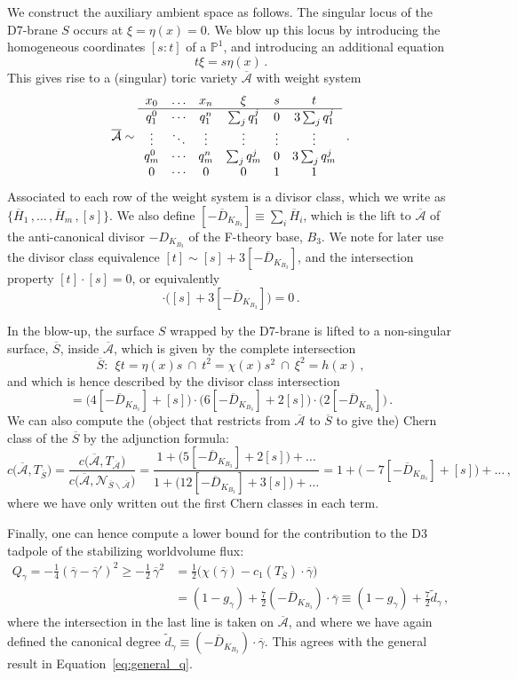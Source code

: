 \documentclass[a4paper,12pt]{article}
\numberwithin{equation}{section}
\newcommand{\mc}{\mathcal}
\newcommand{\mbb}{\mathbb}
\newcommand{\be}{\begin{equation}}
\newcommand{\ee}{\end{equation}}
\newcommand{\fthb}{B_3}				%
\newcommand{\cand}[1]{D_{K_{#1}}}		%
\newcommand{\candl}{\overline{D}_{K_{B_3}}}	%
\newcommand{\asl}{\overline{\mc{A}}}	%
\newcommand{\db}{S}					%
\newcommand{\dbl}{\overline{S}}		%
\newcommand{\crv}{\gamma}			%
\newcommand{\crvl}{\overline{\gamma}}	%
\newcommand{\degr}[1]{\tilde{d}_{#1}}			%
\newcommand{\tanb}[1]{T_{#1}}			%
\newcommand{\nrmb}[2]{\mc{N}_{{#1}\backslash{#2}}}%
\begin{document}
We construct the auxiliary ambient space as follows. The singular locus of the D7-brane $\db$ occurs at $\xi=\eta(x)=0$. We blow up this locus by introducing the homogeneous coordinates $[s:t]$ of a $\mbb{P}^1$, and introducing an additional equation
\be
t \xi = s \eta(x) \,.
\ee
This gives rise to a (singular) toric variety $\asl$ with weight system
\be
\asl \sim
\begin{array}{c c c c c c}
x_0 & \ldots & x_n & \xi & s & t \\
\hline
q_1^0 & \cdots & q_1^n & \sum_j q_1^j & 0 & 3\sum_j q_1^j \\
\vdots & \ddots & \vdots & \vdots & \vdots & \vdots  \\
q_m^0 & \cdots & q_m^n & \sum_j q_m^j & 0 & 3\sum_j q_m^j  \\
0 & \cdots & 0 & 0 & 1 & 1 
\end{array} ~.
\ee
Associated to each row of the weight system is a divisor class, which we write as $\{\overline{H}_1 \,, \ldots \,, \overline{H}_m \,, [s]\}$. We also define $[-\candl] \equiv \sum_i \overline{H}_i$, which is the lift to $\asl$ of the anti-canonical divisor $-\cand{\fthb}$ of the F-theory base, $\fthb$. We note for later use the divisor class equivalence $[t] \sim [s]+3[-\candl]$, and the intersection property $[t] \cdot [s] = 0$, or equivalently
\be
[s] \cdot \big([s] + 3[-\candl]\big) = 0 \,.
\ee

In the blow-up, the surface $\db$ wrapped by the D7-brane is lifted to a non-singular surface, $\dbl$, inside $\asl$, which is given by the complete intersection
\be
\dbl: ~~ \xi t = \eta(x) s ~\cap~ t^2 = \chi(x) s^2 ~\cap~ \xi^2 = h(x) \,,
\ee
and which is hence described by the divisor class intersection
\be
[\dbl] = \big(4[-\candl]+[s]\big) \cdot \big(6[-\candl]+2[s]\big) \cdot \big(2[-\candl]\big) \,.
\ee
We can also compute the (object that restricts from $\asl$ to $\dbl$ to give the) Chern class of the $\dbl$ by the adjunction formula:
\be
c\big(\asl,\tanb{\dbl}\big) = \frac{c\big(\asl,\tanb{\asl}\big)}{c\big(\asl,\nrmb{\dbl}{\asl}\big)} = \frac{1+\big(5[-\candl]+2[s]\big)+\ldots}{1+\big(12[-\candl]+3[s]\big)+\ldots} = 1+\big(-7[-\candl]+[s]\big)+\ldots \,,
\label{eq:ch_auxsurf}
\ee
where we have only written out the first Chern classes in each term.


Finally, one can hence compute a lower bound for the contribution to the D3 tadpole of the stabilizing worldvolume flux: 
\be
\begin{aligned}
Q_\crv = -\frac{1}{4}(\crvl-\crvl')^2 \geq -\frac{1}{2}\,\crvl^2 &= \frac{1}{2}\big(\chi(\crvl)- c_1(\tanb{\dbl}) \cdot \crvl\big) \\
&= (1-g_\crv) + \frac{7}{2} (-\candl) \cdot \crvl  \equiv (1-g_\crv) + \frac{7}{2} \degr{\crv}
\,,
\end{aligned}
\label{eq:tadp_cont_tor}
\ee
where the intersection in the last line is taken on $\asl$, and where we have again defined the canonical degree $\degr{\crv} \equiv (-\candl) \cdot \crvl$. This agrees with the general result in Equation~\eqref{eq:general_q}.
	
\end{document}
